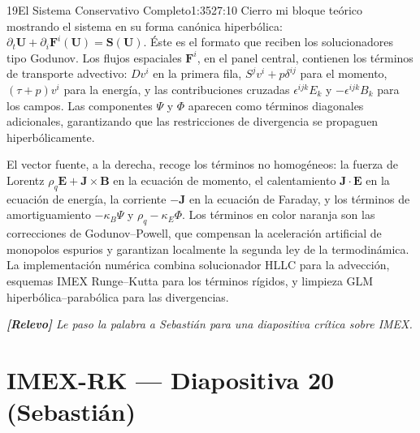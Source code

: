 \documentclass[11pt,a4paper]{article}
\newcommand{\relevo}[1]{%
  \par\medskip
  \noindent\colorbox{tagbg}{\parbox{\dimexpr\linewidth-2\fboxsep\relax}{%
    \small\itshape \textbf{[Relevo]} #1}}\par\medskip}
\begin{document}
\begin{bryorador}{19}{El Sistema Conservativo Completo}{1:35}{27:10}
Cierro mi bloque teórico mostrando el sistema en su forma canónica
hiperbólica: $\partial_t \mathbf{U}+\partial_i \mathbf{F}^i(\mathbf{U})=
\mathbf{S}(\mathbf{U})$. Éste es el formato que reciben los solucionadores
tipo Godunov. Los flujos espaciales $\mathbf{F}^i$, en el panel central,
contienen los términos de transporte advectivo: $Dv^i$ en la primera fila,
$S^j v^i+p\delta^{ij}$ para el momento, $(\tau+p)v^i$ para la energía, y las
contribuciones cruzadas $\epsilon^{ijk}E_k$ y $-\epsilon^{ijk}B_k$ para los
campos. Las componentes $\Psi$ y $\Phi$ aparecen como términos diagonales
adicionales, garantizando que las restricciones de divergencia se propaguen
hiperbólicamente.

El vector fuente, a la derecha, recoge los términos no homogéneos: la fuerza
de Lorentz $\rho_q\mathbf{E}+\mathbf{J}\times\mathbf{B}$ en la ecuación de
momento, el calentamiento $\mathbf{J}\cdot\mathbf{E}$ en la ecuación de
energía, la corriente $-\mathbf{J}$ en la ecuación de Faraday, y los
términos de amortiguamiento $-\kappa_B\Psi$ y $\rho_q-\kappa_E\Phi$. Los
términos en color naranja son las correcciones de Godunov--Powell, que
compensan la aceleración artificial de monopolos espurios y garantizan
localmente la segunda ley de la termodinámica. La implementación numérica
combina solucionador HLLC para la advección, esquemas IMEX Runge--Kutta para
los términos rígidos, y limpieza GLM hiperbólica--parabólica para las
divergencias.
\relevo{Le paso la palabra a Sebastián para una diapositiva crítica sobre IMEX.}
\end{bryorador}

\section{IMEX-RK --- Diapositiva 20 (Sebastián)}
\end{document}
